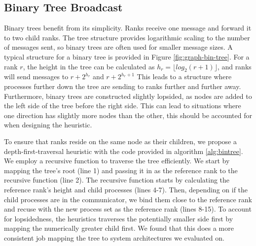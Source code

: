 \subsection{Binary Tree Broadcast}
Binary trees benefit from its simplicity.
Ranks receive one message and forward it to two child ranks.
The tree structure provides logarithmic scaling to the number of messages sent, so binary trees are often used for smaller message sizes. 
A typical structure for a binary tree is provided in Figure \ref{fig:graph-bin-tree}.
For a rank $r$, the height in the tree can be calculated as $h_r = \lfloor log_2(r+1) \rfloor$, and ranks will send messages to $r + 2^{h_r}$ and $r + 2^{h_r + 1}$
This leads to a structure where processes further down the tree are sending to ranks further and further away.
Furthermore, binary trees are constructed slightly lopsided,  as nodes are added to the left side of the tree before the right side. 
This can lead to situations where one direction has slightly more nodes than the other, this should be accounted for when designing the heuristic.

To ensure that ranks reside on the same node as their children, we propose a depth-first-traversal heuristic with the code provided in algorithm \ref{alg:bintree}.
We employ a recursive function to traverse the tree efficiently. 
We start by mapping the tree's root (line 1) and passing it in as the reference rank to the recursive function (line 2).
The recursive function starts by calculating the reference rank's height and child processes (lines 4-7). 
Then, depending on if the child processes are in the communicator, we bind them close to the reference rank and recuse with the new process set as the reference rank (lines 8-15).
To account for lopsidedness, the heuristics traverses the potentially smaller side first by mapping the numerically greater child first.
We found that this does a more consistent job mapping the tree to system architectures we evaluated on.


% 


